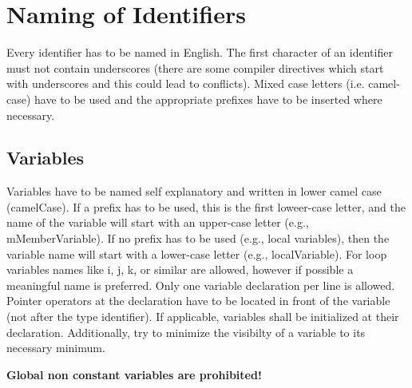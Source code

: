 \documentclass[final,a4paper,10pt, oneside]{article}
\begin{document}
\section{Naming of Identifiers}
Every identifier has to be named in English. 
The first character of an identifier must not contain underscores (there are some compiler directives which start with underscores and this could lead to conflicts). 
Mixed case letters (i.e. camel-case) have to be used and the appropriate prefixes have to be inserted where necessary.


\subsection{Variables}
Variables have to be named self explanatory and written in lower camel case (camelCase).
If a prefix has to be used, this is the first loweer-case letter, and the name of the variable will start with an upper-case letter (e.g., mMemberVariable).
If no prefix has to be used (e.g., local variables), then the variable name will start with a lower-case letter (e.g., localVariable).
For loop variables names like i, j, k, or similar are allowed, however if possible a meaningful name is preferred.
Only one variable declaration per line is allowed.
Pointer operators at the declaration have to be located in front of the variable (not after the type identifier).
If applicable, variables shall be initialized at their declaration.
Additionally, try to minimize the visibilty of a variable to its necessary minimum.

\textbf{Global non constant variables are prohibited!}
\end{document}
